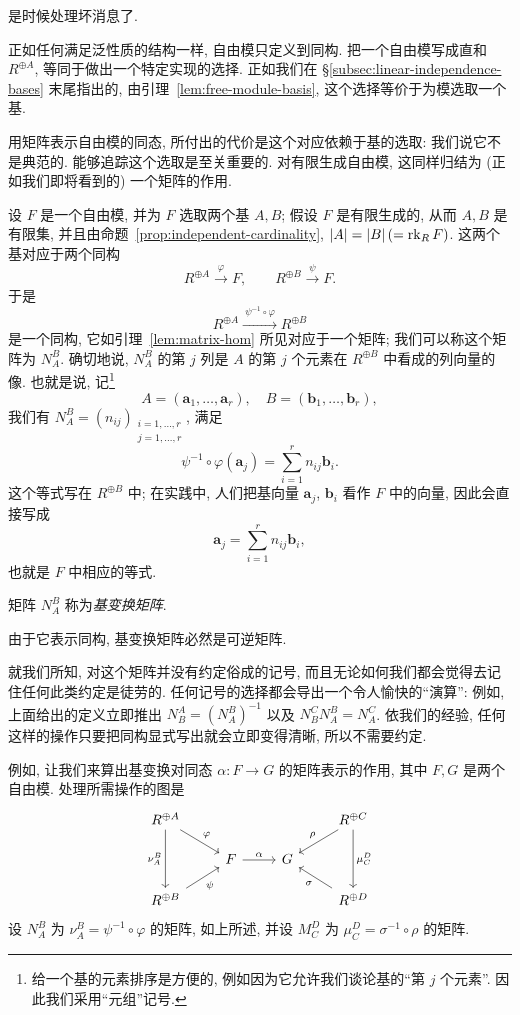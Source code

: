是时候处理坏消息了.

正如任何满足泛性质的结构一样, 自由模只定义到同构. 把一个自由模写成直和 $R^{\oplus A}$, 等同于做出一个特定实现的选择. 正如我们在 §\ref{subsec:linear-independence-bases} 末尾指出的, 由引理~\ref{lem:free-module-basis}, 这个选择等价于为模选取一个基.

用矩阵表示自由模的同态, 所付出的代价是这个对应依赖于基的选取: 我们说它不是典范的. 能够追踪这个选取是至关重要的. 对有限生成自由模, 这同样归结为 (正如我们即将看到的) 一个矩阵的作用.

设 $F$ 是一个自由模, 并为 $F$ 选取两个基 $A,B$; 假设 $F$ 是有限生成的, 从而 $A,B$ 是有限集, 并且由命题~\ref{prop:independent-cardinality}, $|A|=|B|\,(=\operatorname{rk}_R F)$. 这两个基对应于两个同构
\[
R^{\oplus A}\xrightarrow{\ \varphi\ } F,\qquad R^{\oplus B}\xrightarrow{\ \psi\ } F.
\]
于是
\[
R^{\oplus A}\xrightarrow{\ \psi^{-1}\circ\varphi\ } R^{\oplus B}
\]
是一个同构, 它如引理~\ref{lem:matrix-hom} 所见对应于一个矩阵; 我们可以称这个矩阵为 $N_A^B$. 确切地说, $N_A^B$ 的第 $j$ 列是 $A$ 的第 $j$ 个元素在 $R^{\oplus B}$ 中看成的列向量的像. 也就是说, 记\footnote{给一个基的元素排序是方便的, 例如因为它允许我们谈论基的``第 $j$ 个元素''. 因此我们采用``元组''记号.}
\[
A=(\mathbf{a}_1,\dots,\mathbf{a}_r),\quad B=(\mathbf{b}_1,\dots,\mathbf{b}_r),
\]
我们有 $N_A^B=(n_{ij})_{\substack{i=1,\dots,r\\ j=1,\dots,r}}$, 满足
\[
\psi^{-1}\circ\varphi(\mathbf{a}_j) = \sum_{i=1}^{r} n_{ij}\mathbf{b}_i.
\]
这个等式写在 $R^{\oplus B}$ 中; 在实践中, 人们把基向量 $\mathbf{a}_j$, $\mathbf{b}_i$ 看作 $F$ 中的向量, 因此会直接写成
\[
\mathbf{a}_j = \sum_{i=1}^{r} n_{ij}\mathbf{b}_i,
\]
也就是 $F$ 中相应的等式.

\begin{definition}\label{def:change-of-basis-matrix}
矩阵 $N_A^B$ 称为\emph{基变换矩阵}.
\end{definition}

由于它表示同构, 基变换矩阵必然是可逆矩阵.

就我们所知, 对这个矩阵并没有约定俗成的记号, 而且无论如何我们都会觉得去记住任何此类约定是徒劳的. 任何记号的选择都会导出一个令人愉快的``演算'': 例如, 上面给出的定义立即推出 $N_B^A=(N_A^B)^{-1}$ 以及 $N_B^C N_A^B = N_A^C$. 依我们的经验, 任何这样的操作只要把同构显式写出就会立即变得清晰, 所以不需要约定.

例如, 让我们来算出基变换对同态 $\alpha:F\to G$ 的矩阵表示的作用, 其中 $F,G$ 是两个自由模. 处理所需操作的图是
\[
\begin{tikzcd}[row sep=1.4em,column sep=2.4em]
R^{\oplus A} \ar[dr,"\varphi"] \ar[dd,"\nu_A^B"'] & & & R^{\oplus C} \ar[dl,"\rho"'] \ar[dd,"\mu_C^D"] \\
& F \ar[r,"\alpha"] & G & \\
R^{\oplus B} \ar[ur,"\psi"'] & & & R^{\oplus D} \ar[ul,"\sigma"]
\end{tikzcd}
\]
设 $N_A^B$ 为 $\nu_A^B=\psi^{-1}\circ\varphi$ 的矩阵, 如上所述, 并设 $M_C^D$ 为 $\mu_C^D=\sigma^{-1}\circ\rho$ 的矩阵.

